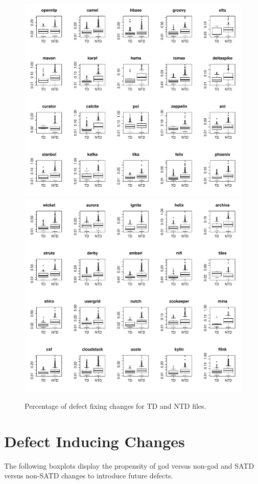 \begin{figure}[tb]
	\centering
	\includegraphics[width=120mm]{figures/chapter4/RQ1_boxplots_td_1}
	\includegraphics[width=120mm]{figures/chapter4/RQ1_boxplots_td_2}
	\caption{Percentage of defect fixing changes for TD and NTD files.}
	\label{figure:percentage_of_defects_td_vs_ntd}
\end{figure}



\chapter{Defect Inducing Changes}
The following boxplots display the propensity of god versus non-god and SATD versus non-SATD changes to introduce future defects.

